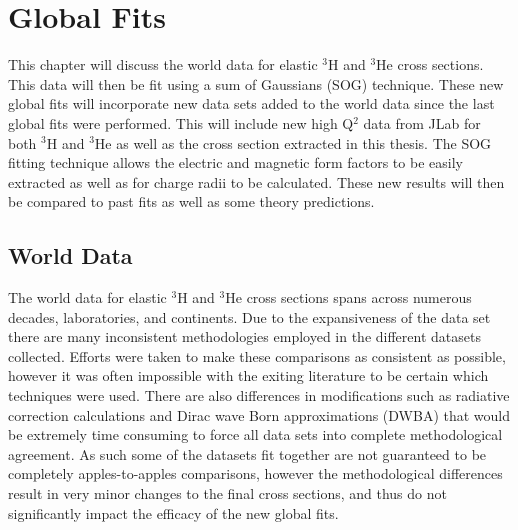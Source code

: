 \chapter{Global Fits} %
\label{ch:global_fits} %

This chapter will discuss the world data for elastic $^3$H and $^3$He cross sections. This data will then be fit using a sum of Gaussians (SOG) technique. These new global fits will incorporate new data sets added to the world data since the last global fits were performed. This will include new high Q$^2$ data from JLab for both $^3$H and $^3$He as well as the cross section extracted in this thesis. The SOG fitting technique allows the electric and magnetic form factors to be easily extracted as well as for charge radii to be calculated. These new results will then be compared to past fits as well as some theory predictions.

\section{World Data}
\label{sec:world_data}

The world data for elastic $^3$H and $^3$He cross sections spans across numerous decades, laboratories, and continents. Due to the expansiveness of the data set there are many inconsistent methodologies employed in the different datasets collected. Efforts were taken to make these comparisons as consistent as possible, however it was often impossible with the exiting literature to be certain which techniques were used. There are also differences in modifications such as radiative correction calculations and Dirac wave Born approximations (DWBA) that would be extremely time consuming to force all data sets into complete methodological agreement. As such some of the datasets fit together are not guaranteed to be completely apples-to-apples comparisons, however the methodological differences result in very minor changes to the final cross sections, and thus do not significantly impact the efficacy of the new global fits.

